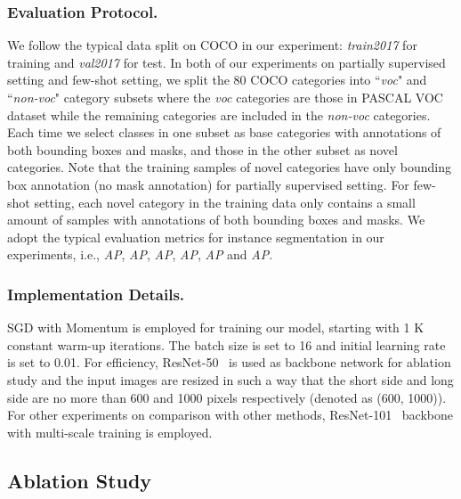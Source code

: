 \documentclass[runningheads]{llncs}
\begin{document}
\subsubsection{Evaluation Protocol.}
We follow the typical data split on COCO in our experiment: \emph{train2017} for training and \emph{val2017} for test. In both of our experiments on partially supervised setting and few-shot setting, we split the 80 COCO categories into ``\emph{voc}" and ``\emph{non-voc}" category subsets where the \emph{voc} categories are those in PASCAL VOC~\cite{everingham2010pascal} dataset while the remaining categories are included in the \emph{non-voc} categories. Each time we select classes in one subset as base categories with annotations of both bounding boxes and masks, and those in the other subset as novel categories. Note that the training samples of novel categories have only bounding box annotation (no mask annotation) for partially supervised setting. For few-shot setting, each novel category in the training data only contains a small amount of samples with annotations of both bounding boxes and masks. We adopt the typical evaluation metrics for instance segmentation in our experiments, i.e., \emph{AP}, \emph{AP}, \emph{AP}, \emph{AP}, \emph{AP} and \emph{AP}.

\vspace{-0.2in}

\subsubsection{Implementation Details.}
SGD with Momentum is employed for training our model, starting with 1 K constant warm-up iterations. The batch size is set to 16 and initial learning rate is set to 0.01.  For efficiency, ResNet-50~\cite{he2016deep} is used as backbone network for ablation study and the input images are resized in such a way that the short side and long side are no more than 600 and 1000 pixels respectively (denoted as (600, 1000)). For other experiments on comparison with other methods, ResNet-101~\cite{he2016deep} backbone with multi-scale training is employed. 

\vspace{-0.15in}
\subsection{Ablation Study}
\vspace{-2mm}
\end{document}
